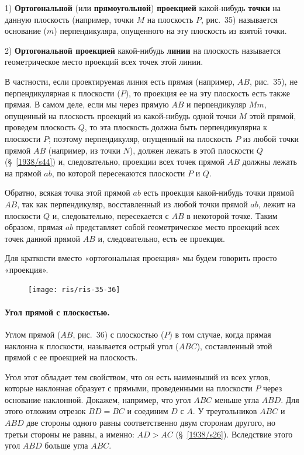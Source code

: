 \documentclass[twoside]{book}
\begin{document}
1) \textbf{Ортогональной} (или \textbf{прямоугольной}) \textbf{проекцией} какой-нибудь \textbf{точки} на данную плоскость (например, точки $M$ на плоскость $P$, рис.~35) называется основание ($m$) перпендикуляра, опущенного на эту плоскость из взятой точки.

2) \textbf{Ортогональной проекцией} какой-нибудь \textbf{линии} на плоскость называется геометрическое место проекций всех точек этой линии.

В частности, если проектируемая линия есть прямая (например, $AB$, рис.~35), не перпендикулярная к плоскости ($P$), то проекция ее на эту плоскость есть также прямая.
В самом деле, если мы через прямую $AB$ и перпендикуляр $Mm$, опущенный на плоскость проекций из какой-нибудь одной точки $M$ этой прямой, проведем плоскость $Q$, то эта плоскость должна быть перпендикулярна к плоскости $P$;
поэтому перпендикуляр, опущенный на плоскость $P$ из любой точки прямой $AB$ (например, из точки $N$), должен лежать в этой плоскости $Q$ (§~\ref{1938/s44}) и, следовательно, проекции всех точек прямой $AB$ должны лежать на прямой $ab$, по которой пересекаются плоскости $P$ и $Q$.

Обратно, всякая точка этой прямой $ab$ есть проекция какой-нибудь точки прямой $AB$, так как перпендикуляр, восставленный из любой точки прямой $ab$, лежит на плоскости $Q$ и, следовательно, пересекается с $AB$ в некоторой точке.
Таким образом, прямая $ab$ представляет собой геометрическое место проекций всех точек данной прямой $AB$ и, следовательно, есть ее проекция.

Для краткости вместо «ортогональная проекция» мы будем говорить просто «проекция».

\begin{figure}[h!]
\centering
\texttt{[image: ris/ris-35-36]}
\caption{}
\end{figure}

\paragraph{Угол прямой с плоскостью.}\label{1938/s48}
Углом прямой ($AB$, рис.~36) с плоскостью ($P$) в том случае, когда прямая наклонна к плоскости, называется острый угол ($ABC$), составленный этой прямой с ее проекцией на плоскость. %

Угол этот обладает тем свойством, что он есть наименьший из всех углов, которые наклонная образует с прямыми, проведенными на плоскости $P$ через основание наклонной.
Докажем, например, что угол $ABC$ меньше угла $ABD$.
Для этого отложим отрезок $BD=BC$ и соединим $D$ с $A$.
У треугольников $ABC$ и $ABD$ две стороны одного равны соответственно двум сторонам другого, но третьи стороны не равны, а именно: $AD>AC$ (§~\ref{1938/s26}).
Вследствие этого угол $ABD$ больше угла $ABC$.
\end{document}
